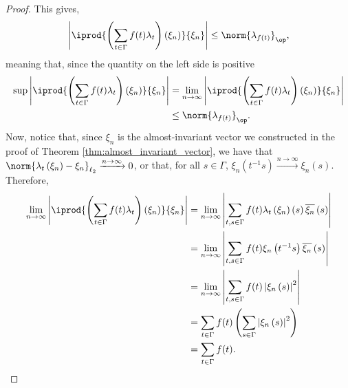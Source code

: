 \begin{proof}
  This gives, 
  \begin{align*}
    \left\vert \iprod{\left( \sum_{t\in\Gamma}f(t)\lambda_t \right)\left( \xi_n \right)}{\xi_n} \right\vert \leq \norm{\lambda_{f(t)}}_{\op},
  \end{align*}
  meaning that, since the quantity on the left side is positive
  \begin{align*}
    \sup \left\vert \iprod{\left( \sum_{t\in\Gamma}f(t)\lambda_t \right)\left( \xi_n \right)}{\xi_n} \right\vert &= \lim_{n\rightarrow\infty}\left\vert \iprod{\left( \sum_{t\in\Gamma} f(t)\lambda_t\right)\left( \xi_n \right)}{\xi_n} \right\vert \\
                                                                                                                 &\leq \norm{\lambda_{f(t)}}_{\op}.
  \end{align*}
  Now, notice that, since $\xi_n$ is the almost-invariant vector we constructed in the proof of Theorem \ref{thm:almost_invariant_vector}, we have that $\norm{\lambda_t\left( \xi_n \right)-\xi_n}_{\ell_2}\xrightarrow{n\rightarrow\infty} 0$, or that, for all $s\in\Gamma$, $\xi_n\left( t^{-1}s \right)\xrightarrow{n\rightarrow\infty} \xi_n\left( s \right)$. Therefore, 
  \begin{align*}
    \lim_{n\rightarrow\infty} \left\vert \iprod{\left( \sum_{t\in\Gamma}f(t)\lambda_t \right)\left( \xi_n \right)}{\xi_n} \right\vert &= \lim_{n\rightarrow\infty}\left\vert \sum_{t,s\in\Gamma}f(t)\lambda_t\left( \xi_n \right)\left( s \right)\overline{\xi_n}\left( s \right) \right\vert\\
                                                                                                                                      &= \lim_{n\rightarrow\infty}\left\vert \sum_{t,s\in\Gamma}f(t)\xi_n\left( t^{-1}s \right)\overline{\xi_n}\left( s \right) \right\vert\\
                                                                                                                                      &= \lim_{n\rightarrow\infty}\left\vert \sum_{t,s\in\Gamma}f(t)\left\vert \xi_n\left( s \right) \right\vert^2 \right\vert\\
                                                                                                                                      &= \sum_{t\in\Gamma}f(t)\left( \sum_{s\in\Gamma}\left\vert \xi_n\left( s \right) \right\vert^{2} \right)\\
                                                                                                                                      &= \sum_{t\in\Gamma}f(t).

\end{align*}
\end{proof}
